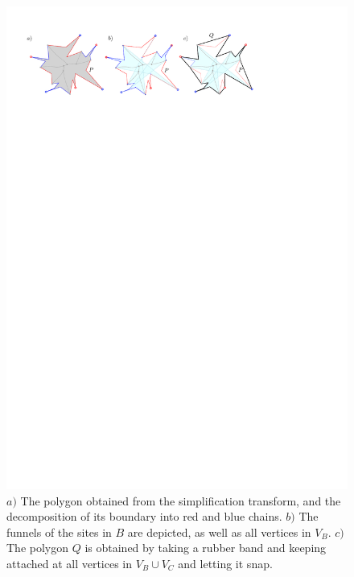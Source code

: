 \documentclass[a4paper,UKenglish]{socg-lipics-v2018}
\begin{document}
\begin{figure}[t]
\centering
\includegraphics{Reduction.pdf}
\caption{$a)$ The polygon obtained from the simplification transform, and the decomposition of its boundary into red and blue chains.
$b)$ The funnels of the sites in $B$ are depicted, as well as all vertices in $V_B$.
$c)$ The polygon $Q$ is obtained by taking a rubber band and keeping attached at all vertices in $V_B\cup V_C$ and letting it snap. }
\label{fig:Reduction}
\end{figure}
\end{document}
